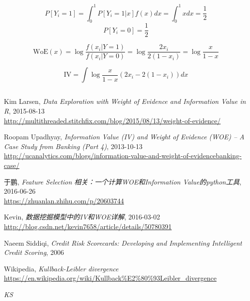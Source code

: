\documentclass[a4paper,UTF8]{ctexart}
\begin{document}
\begin{equation}
  P[Y_i = 1] = \int^1_0 P[Y_i=1|x]f(x)dx = \int^1_0 x dx = \frac{1}{2}
\end{equation}
\begin{equation}
  P[Y_i = 0] = \frac{1}{2}
\end{equation}


\begin{equation}
  \text{WoE}(x) = \log \frac{f(x_i|Y=1)}{f(x_i|Y=0)} = \log \frac{2 x_i}{2 (1-x_i)} = \log \frac{x}{1-x}
\end{equation}

\begin{equation}
  \text{IV} = \int \log \frac{x}{1-x} (2 x_i - 2 (1-x_i)) dx
\end{equation}

\begin{equation}
\end{equation}

    
\begin{thebibliography}{9}

    Kim Larsen,
    \textit{Data Exploration with Weight of Evidence and Information Value in R},
    2015-08-13\\
    \url{http://multithreaded.stitchfix.com/blog/2015/08/13/weight-of-evidence/}

    Roopam Upadhyay,
    \textit{Information Value (IV) and Weight of Evidence (WOE) – A Case Study from Banking (Part 4)},
    2013-10-13\\
    \url{http://ucanalytics.com/blogs/information-value-and-weight-of-evidencebanking-case/}

    于鹏,
    \textit{Feature Selection 相关：一个计算WOE和Information Value的python工具},
    2016-06-26\\
    \url{https://zhuanlan.zhihu.com/p/20603744}

    Kevin,
    \textit{数据挖掘模型中的IV和WOE详解},
    2016-03-02\\
    \url{http://blog.csdn.net/kevin7658/article/details/50780391}

    Naeem Siddiqi,
    \textit{Credit Risk Scorecards: Developing and Implementing Intelligent Credit Scoring},
    2006

    Wikipedia,
    \textit{Kullback-Leibler divergence}\\
    \url{https://en.wikipedia.org/wiki/Kullback\%E2\%80\%93Leibler_divergence}

    \textit{KS}

\end{thebibliography}
\end{document}

